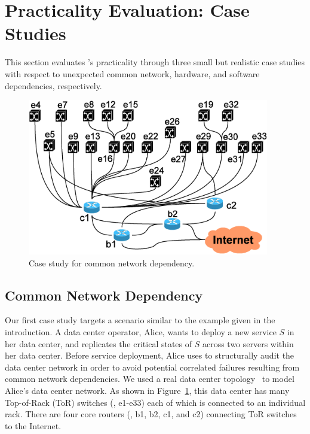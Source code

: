 
\section{Practicality Evaluation: Case Studies}
\label{sec-case}

This section evaluates \app's practicality through
three small but realistic case studies with respect to
unexpected common
network, hardware, and software dependencies, respectively.

\begin{figure}[tb] \centering
\includegraphics[width=0.94\textwidth]{figs/enterprise.eps}
\caption{Case study for common network dependency.}
\label{fig-case1}
\end{figure}

\subsection{Common Network Dependency}
\label{subsec-case1}

Our first case study targets a scenario
similar to the example given in the introduction.
A data center operator, Alice, wants to deploy a new service $S$
in her data center, and replicates the critical states of $S$ across
two servers within her data center.
Before service deployment,
Alice uses \app to structurally audit
the data center network in order to avoid
potential correlated failures resulting from common
network dependencies.
We used a real data center topology~\cite{benson10network} to model
Alice's data center network.
As shown in Figure~\ref{fig-case1},
this data center has many Top-of-Rack (ToR) switches (\ie, e1-e33)
each of which is connected to an individual rack.
There are four core routers (\ie, b1, b2, c1, and c2)
connecting ToR switches to the Internet.

